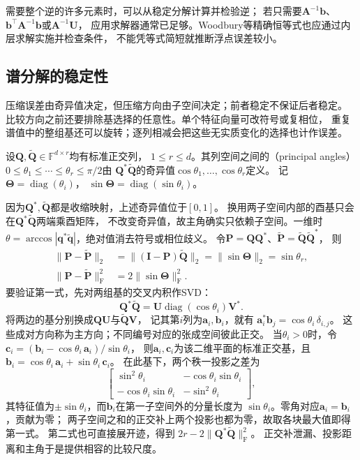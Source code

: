 需要整个逆的许多元素时，可以从稳定分解计算并检验逆；
若只需要$\bm A^{-1}\bm b$、$\bm b^\top\bm A^{-1}\bm b$或$\bm A^{-1}\bm U$，
应用求解器通常已足够。Woodbury等精确恒等式也应通过内层求解实施并检查条件，
不能凭等式简短就推断浮点误差较小。


\subsection{谱分解的稳定性}
\label{sec:linear-algebra-spectral-stability}
\label{sec:ch06-spectral-stability}


压缩误差由奇异值决定，但压缩方向由子空间决定；前者稳定不保证后者稳定。
比较方向之前还要排除基选择的任意性。单个特征向量可改符号或复相位，
重复谱值中的整组基还可以旋转；逐列相减会把这些无实质变化的选择也计作误差。

\begin{definition}[等维子空间的主角]
\label{def:matrix-analysis-principal-angles}
设$\bm Q,\widetilde{\bm Q}\in\mathbb F^{d\times r}$均有标准正交列，
$1\leq r\leq d$。其列空间之间的（principal angles）
$0\leq\theta_1\leq\cdots\leq\theta_r\leq\pi/2$由
$\bm Q^*\widetilde{\bm Q}$的奇异值$\cos\theta_1,\ldots,\cos\theta_r$定义。
记$\bm\Theta=\operatorname{diag}(\theta_i)$，
$\sin\bm\Theta=\operatorname{diag}(\sin\theta_i)$。
\end{definition}
因为$\bm Q^*,\widetilde{\bm Q}$都是收缩映射，上述奇异值位于$[0,1]$。
换用两子空间内部的酉基只会在$\bm Q^*\widetilde{\bm Q}$两端乘酉矩阵，
不改变奇异值，故主角确实只依赖子空间。一维时
$\theta=\arccos|\bm q^*\widetilde{\bm q}|$，绝对值消去符号或相位歧义。
令$\bm P=\bm Q\bm Q^*$、$\widetilde{\bm P}=\widetilde{\bm Q}\widetilde{\bm Q}^*$，
则
\begin{align*}
 \lVert\bm P-\widetilde{\bm P}\rVert_2
 &=\lVert(\bm I-\bm P)\widetilde{\bm Q}\rVert_2
  =\lVert\sin\bm\Theta\rVert_2=\sin\theta_r,\\
 \lVert\bm P-\widetilde{\bm P}\rVert_{\mathrm F}^2
 &=2\lVert\sin\bm\Theta\rVert_{\mathrm F}^2.
\end{align*}
要验证第一式，先对两组基的交叉内积作SVD：
\[
 \bm Q^*\widetilde{\bm Q}
 =\bm U\operatorname{diag}(\cos\theta_i)\bm V^*.
\]
将两边的基分别换成$\bm Q\bm U$与$\widetilde{\bm Q}\bm V$，
记其第$i$列为$\bm a_i,\bm b_i$，就有
$\bm a_i^*\bm b_j=\cos\theta_i\,\delta_{i,j}$。
这些成对方向称为主方向；不同编号对应的张成空间彼此正交。
当$\theta_i>0$时，令
$\bm c_i=(\bm b_i-\cos\theta_i\,\bm a_i)/\sin\theta_i$，
则$\bm a_i,\bm c_i$为该二维平面的标准正交基，且
$\bm b_i=\cos\theta_i\,\bm a_i+\sin\theta_i\,\bm c_i$。
在此基下，两个秩一投影之差为
\[
 \begin{bmatrix}
  \sin^2\theta_i&-\cos\theta_i\sin\theta_i\\
  -\cos\theta_i\sin\theta_i&-\sin^2\theta_i
 \end{bmatrix},
\]
其特征值为$\pm\sin\theta_i$，而$\bm b_i$在第一子空间外的分量长度为
$\sin\theta_i$。零角对应$\bm a_i=\bm b_i$，贡献为零；
两子空间之和的正交补上两个投影也都为零，故取各块最大值即得第一式。
第二式也可直接展开迹，得到
$2r-2\lVert\bm Q^*\widetilde{\bm Q}\rVert_{\mathrm F}^2$。
正交补泄漏、投影距离和主角于是提供相容的比较尺度。


